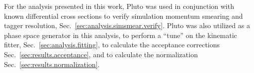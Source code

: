 %
%	
	For the analysis presented in this work, Pluto was used in conjunction with known differential cross sections to verify simulation momentum smearing and tagger resolution, Sec.~\ref{sec:analysis.simsmear.verify}. Pluto was also utilized as a phase space generator in this analysis, to perform a ``tune'' on the kinematic fitter, Sec.~\ref{sec:analysis.fitting}, to calculate the acceptance corrections Sec.~\ref{sec:results.acceptance}, and to calculate the normalization Sec.~\ref{sec:results.normalization}.